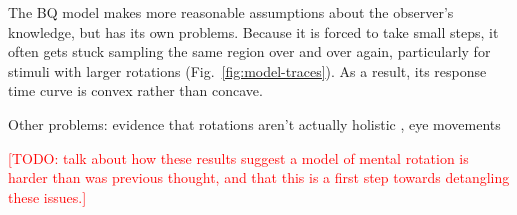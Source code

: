 \documentclass[10pt,letterpaper]{article}
\newcommand{\TODO}[1]{\textcolor{red}{[TODO: #1]}}
\newcommand{\Bq}[0]{BQ}
\begin{document}
The \Bq{} model makes more reasonable assumptions about the observer's
knowledge, but has its own problems. Because it is forced to take
small steps, it often gets stuck sampling the same region over and
over again, particularly for stimuli with larger rotations
(Fig.~\ref{fig:model-traces}). As a result, its response time curve is
convex rather than concave.

Other problems: evidence that rotations aren't actually holistic
\cite{Yuille:1982tx}, eye movements \cite{Just1976}

\TODO{talk about how these results suggest a model of mental rotation
  is harder than was previous thought, and that this is a first step
  towards detangling these issues.}




\renewcommand{\bibliographytypesize}{\small}
\setlength{\bibleftmargin}{.125in}
\setlength{\bibindent}{-\bibleftmargin}

\end{document}

